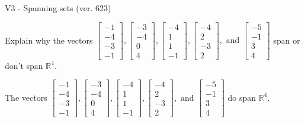 \begin{exercise}
  \begin{exerciseTitle}V3 - Spanning sets (ver. 623)\end{exerciseTitle}
  \begin{exerciseStatement}
    Explain why the vectors \(\left[\begin{array}{r}
-1 \\
-4 \\
-3 \\
-1
\end{array}\right] , \left[\begin{array}{r}
-3 \\
-4 \\
0 \\
4
\end{array}\right] , \left[\begin{array}{r}
-4 \\
1 \\
1 \\
-1
\end{array}\right] , \left[\begin{array}{r}
-4 \\
2 \\
-3 \\
2
\end{array}\right] , \text{ and } \left[\begin{array}{r}
-5 \\
-1 \\
3 \\
4
\end{array}\right]\) span or don't span \(\mathbb{R}^4\). 
	


  \end{exerciseStatement}
  \begin{exerciseAnswer}
   The vectors \(\left[\begin{array}{r}
-1 \\
-4 \\
-3 \\
-1
\end{array}\right] , \left[\begin{array}{r}
-3 \\
-4 \\
0 \\
4
\end{array}\right] , \left[\begin{array}{r}
-4 \\
1 \\
1 \\
-1
\end{array}\right] , \left[\begin{array}{r}
-4 \\
2 \\
-3 \\
2
\end{array}\right] , \text{ and } \left[\begin{array}{r}
-5 \\
-1 \\
3 \\
4
\end{array}\right]\) 
  	 do  
	span \(\mathbb{R}^4\).
  



\end{exerciseAnswer}
\end{exercise}
